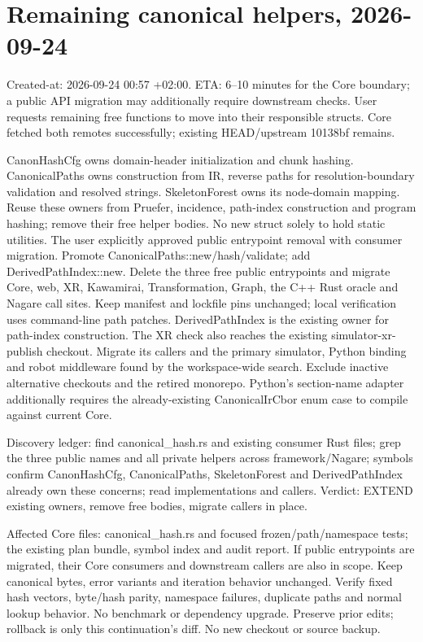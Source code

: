 \documentclass[11pt,a4paper]{article}
\begin{document}
\section*{Remaining canonical helpers, 2026-09-24}
Created-at: 2026-09-24 00:57 +02:00. ETA: 6--10 minutes for the Core boundary;
a public API migration may additionally require downstream checks. User requests
remaining free functions to move into their responsible structs.
Core fetched both remotes successfully; existing HEAD/upstream 10138bf remains.

CanonHashCfg owns domain-header initialization and chunk hashing. CanonicalPaths
owns construction from IR, reverse paths for resolution-boundary validation and
resolved strings. SkeletonForest owns its node-domain mapping. Reuse these
owners from Pruefer, incidence, path-index construction and program hashing;
remove their free helper bodies. No new struct solely to hold static utilities.
The user explicitly approved public entrypoint removal with consumer migration.
Promote CanonicalPaths::new/hash/validate; add DerivedPathIndex::new. Delete the
three free public entrypoints and migrate Core, web, XR, Kawamirai,
Transformation, Graph, the C++ Rust oracle and Nagare call sites. Keep manifest
and lockfile pins unchanged; local verification uses command-line path patches.
DerivedPathIndex is the existing owner for path-index construction.
The XR check also reaches the existing simulator-xr-publish checkout. Migrate
its callers and the primary simulator, Python binding and robot middleware
found by the workspace-wide search. Exclude inactive alternative checkouts and
the retired monorepo. Python's section-name adapter additionally requires the
already-existing CanonicalIrCbor enum case to compile against current Core.

Discovery ledger: find canonical\_hash.rs and existing consumer Rust files;
grep the three public names and all private helpers across framework/Nagare;
symbols confirm CanonHashCfg, CanonicalPaths, SkeletonForest and
DerivedPathIndex already own these concerns; read implementations and callers.
Verdict: EXTEND existing owners, remove free bodies, migrate callers in place.

Affected Core files: canonical\_hash.rs and focused frozen/path/namespace tests;
the existing plan bundle, symbol index and audit report. If public entrypoints
are migrated, their Core consumers and downstream callers are also in scope.
Keep canonical bytes, error variants and iteration behavior unchanged. Verify
fixed hash vectors, byte/hash parity, namespace failures, duplicate paths and
normal lookup behavior. No benchmark or dependency upgrade. Preserve prior edits;
rollback is only this continuation's diff. No new checkout or source backup.
\end{document}
